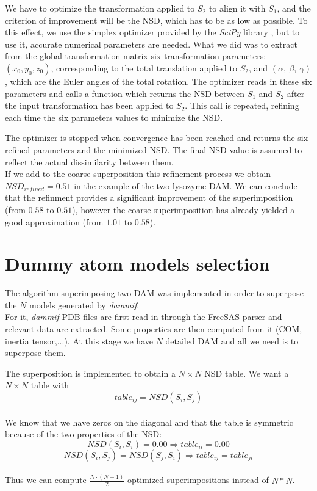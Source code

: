 \documentclass[a4paper, 11pt]{report}
\begin{document}
We have to optimize the transformation applied to $S_{2}$ to align it 
with $S_{1}$, and the criterion of improvement will be the NSD, which 
has to be as low as possible. 
To this effect, we use the simplex optimizer provided by the 
\textit{SciPy} library \cite{scipy}, but to use it, accurate numerical 
parameters are needed. 
What we did was to extract from the global transformation matrix 
six transformation parameters: 
$(x_{0}, y_{0}, z_{0})$, 
corresponding to the total translation applied to $S_{2}$, and 
$(\alpha,\ \beta,\ \gamma)$, 
which are the Euler angles of the total rotation. 
The optimizer reads in these six parameters and calls a function which 
returns the NSD between $S_{1}$ and $S_{2}$ after the input 
transformation has been applied to $S_{2}$. 
This call is repeated, refining each time the six parameters values to 
minimize the NSD.

The optimizer is stopped when convergence has been reached and returns 
the six refined parameters and the minimized NSD. 
The final NSD value is assumed to reflect the actual dissimilarity 
between them.\\

If we add to the coarse superposition this refinement process we 
obtain $NSD_{refined} = 0.51$ in the example of the two lysozyme DAM. 
We can conclude that the refinment provides a significant improvement 
of the superimposition (from $0.58$ to $0.51$), however the coarse 
superimposition has already yielded a good approximation (from $1.01$ 
to $0.58$).

\section{Dummy atom models selection}

The algorithm superimposing two DAM was implemented in order to 
superpose the $N$ models generated by \textit{dammif}.\\

For it, \textit{dammif} PDB files are first read in through the 
FreeSAS parser and relevant data are extracted. 
Some properties are then computed from it (COM, inertia tensor,...). 
At this stage we have $N$ detailed DAM and all we need is to 
superpose them.

The superposition is implemented to obtain a $N \times N$ NSD table. 
We want a $N \times N$ table with 
\[
table_{ij}=NSD(S_{i},S_{j})
\]\\ 
We know that we have zeros on the diagonal and that the table is 
symmetric because of the two properties of the NSD:
\[
NSD(S_{i},S_{i})=0.00 \Rightarrow table_{ii}=0.00
\]
\[
NSD(S_{i},S_{j}) = NSD(S_{j},S_{i}) \Rightarrow table_{ij}=table_{ji}
\]\\
Thus we can compute $\frac{N \cdot (N-1)}{2}$ optimized 
superimpositions instead of $N*N$.\\
\end{document}
